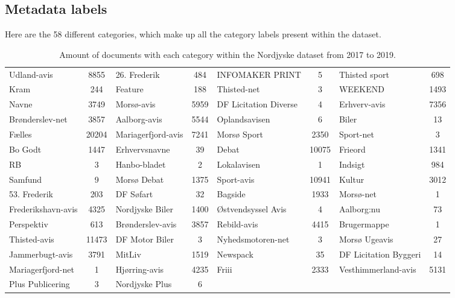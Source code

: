 \subsection{Metadata labels}\label{sec:appendix_meta_data}
Here are the 58 different categories, which make up all the category labels present within the dataset.

\begin{table*}[h]
	\centering
	\begin{tabular}{l|c|l|c|l|c|l|c}
		Udland-avis & 8855 & 26. Frederik & 484 & INFOMAKER PRINT & 5 & Thisted sport & 698\\
		Kram & 244 & Feature & 188 & Thisted-net & 3 & WEEKEND & 1493\\
		Navne & 3749 & Morsø-avis & 5959 & DF Licitation Diverse & 4 & Erhverv-avis & 7356\\
		Brønderslev-net & 3857 & Aalborg-avis & 5544 & Oplandsavisen & 6 & Biler & 13\\
		Fælles & 20204 & Mariagerfjord-avis & 7241 & Morsø Sport & 2350 & Sport-net & 3\\
		Bo Godt & 1447 & Erhvervsnavne & 39 & Debat & 10075 & Frieord & 1341\\
		RB & 3 & Hanbo-bladet & 2 & Lokalavisen & 1 & Indsigt & 984\\
		Samfund & 9 & Morsø Debat & 1375 & Sport-avis & 10941 & Kultur & 3012 \\
		53. Frederik & 203 & DF Søfart & 32 & Bagside & 1933 & Morsø-net & 1 \\
		Frederikshavn-avis & 4325 & Nordjyske Biler & 1400 & Østvendsyssel Avis & 4 & Aalborg:nu & 73\\
		Perspektiv & 613 & Brønderslev-avis & 3857 & Rebild-avis & 4415 & Brugermappe & 1\\
		Thisted-avis & 11473 & DF Motor Biler & 3 & Nyhedsmotoren-net & 3 & Morsø Ugeavis & 27\\
		Jammerbugt-avis & 3791 & MitLiv & 1519 & Newspack & 35 & DF Licitation Byggeri & 14\\
		Mariagerfjord-net & 1 & Hjørring-avis & 4235 & Friii & 2333 & Vesthimmerland-avis & 5131\\
		Plus Publicering & 3 & Nordjyske Plus & 6 & & & & \\
	\end{tabular}
	\caption{Amount of documents with each category within the Nordjyske dataset from 2017 to 2019.}
	\label{tab:category_table}
\end{table*}
